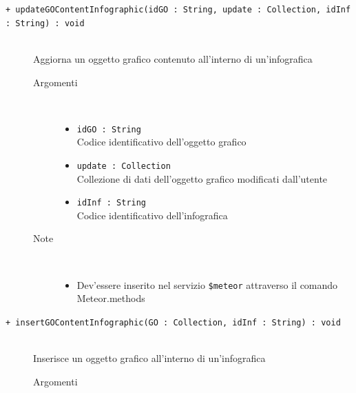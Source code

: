 \begin{description}
	\begin{description}
		\item[\texttt{+ updateGOContentInfographic(idGO : String, update : Collection, idInf : String) : void			}] \hfill \\
			Aggiorna un oggetto grafico contenuto all'interno di un'infografica
			
		\begin{description}
			\item[Argomenti] \hfill \\
				\begin{itemize}
				
					\item \texttt{idGO :  String			} \hfill \\
					Codice identificativo dell'oggetto grafico
					\item \texttt{update : Collection			} \hfill \\
					Collezione di dati dell'oggetto grafico modificati dall'utente
					\item \texttt{idInf :  String			} \hfill \\
					Codice identificativo dell'infografica
					
				\end{itemize}
			\item[Note] \hfill \\
			\begin{itemize}
					\item Dev'essere inserito nel servizio \texttt{\$meteor} attraverso il comando Meteor.methods
				\end{itemize}
		\end{description}
	\end{description}
	
	\begin{description}
		\item[\texttt{+ insertGOContentInfographic(GO : Collection, idInf : String) : void			}] \hfill \\
			Inserisce un oggetto grafico all'interno di un'infografica
			
		\begin{description}
			\item[Argomenti] \hfill \\
				\begin{itemize}
				

\end{itemize}
\end{description}
\end{description}
\end{description}
